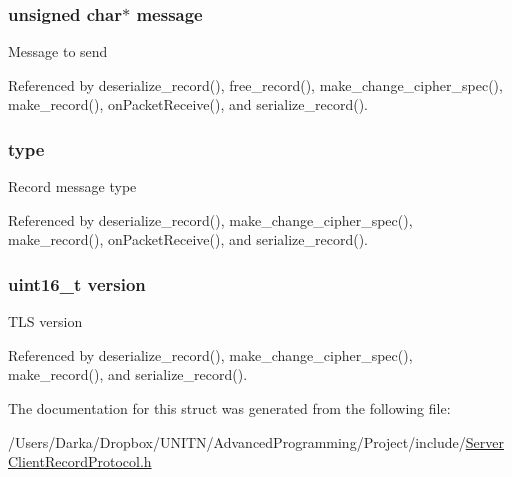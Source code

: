 \subsubsection[{\texorpdfstring{message}{message}}]{\setlength{\rightskip}{0pt plus 5cm}unsigned char$\ast$ message}\hypertarget{structrecord__t_abb13456032cf48eaa794391b6ed937c7}{}\label{structrecord__t_abb13456032cf48eaa794391b6ed937c7}
Message to send 

Referenced by deserialize\+\_\+record(), free\+\_\+record(), make\+\_\+change\+\_\+cipher\+\_\+spec(), make\+\_\+record(), on\+Packet\+Receive(), and serialize\+\_\+record().

\subsubsection[{\texorpdfstring{type}{type}}]{ type}\hypertarget{structrecord__t_ad19c98be8b3445585bee3545c78f6d9c}{}\label{structrecord__t_ad19c98be8b3445585bee3545c78f6d9c}
Record message type 

Referenced by deserialize\+\_\+record(), make\+\_\+change\+\_\+cipher\+\_\+spec(), make\+\_\+record(), on\+Packet\+Receive(), and serialize\+\_\+record().

\subsubsection[{\texorpdfstring{version}{version}}]{\setlength{\rightskip}{0pt plus 5cm}uint16\+\_\+t version}\hypertarget{structrecord__t_ab6d7b6f8c2ceaba7acda80aaf05f4899}{}\label{structrecord__t_ab6d7b6f8c2ceaba7acda80aaf05f4899}
T\+LS version 

Referenced by deserialize\+\_\+record(), make\+\_\+change\+\_\+cipher\+\_\+spec(), make\+\_\+record(), and serialize\+\_\+record().



The documentation for this struct was generated from the following file\+:\begin{DoxyCompactItemize}
\item 
/\+Users/\+Darka/\+Dropbox/\+U\+N\+I\+T\+N/\+Advanced\+Programming/\+Project/include/\hyperlink{_server_client_record_protocol_8h}{Server\+Client\+Record\+Protocol.\+h}\end{DoxyCompactItemize}
